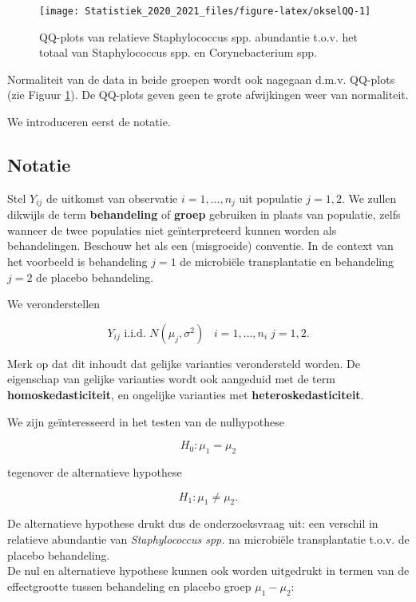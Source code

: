 \documentclass[
  12pt,dutch,coursenotes]{book}
\theoremstyle{definition}
\theoremstyle{definition}
\theoremstyle{definition}
\theoremstyle{remark}
\begin{document}
\begin{figure}

{\centering \texttt{[image: Statistiek\_2020\_2021\_files/figure-latex/okselQQ-1]} 

}

\caption{QQ-plots van relatieve Staphylococcus spp. abundantie t.o.v. het totaal van Staphylococcus spp. en Corynebacterium spp.}\label{fig:okselQQ}
\end{figure}

Normaliteit van de data in beide groepen wordt ook nagegaan d.m.v. QQ-plots (zie Figuur \ref{fig:okselQQ}). De QQ-plots geven geen te grote afwijkingen weer van normaliteit.

We introduceren eerst de notatie.

\hypertarget{notatie}{%
\subsection{Notatie}\label{notatie}}

Stel \(Y_{ij}\) de uitkomst van observatie \(i=1,\ldots, n_j\) uit populatie \(j=1,2\). We zullen dikwijls de term \textbf{behandeling} of \textbf{groep} gebruiken in plaats van populatie, zelfs wanneer de twee populaties niet geïnterpreteerd kunnen worden als behandelingen. Beschouw het als een (misgroeide) conventie. In de context van het voorbeeld is behandeling \(j=1\) de microbiële transplantatie en behandeling \(j=2\) de placebo behandeling.

We veronderstellen

\[Y_{ij}\text{ i.i.d. } N(\mu_j,\sigma^2)\;\;\;i=1,\ldots,n_i\;j=1,2.\]

Merk op dat dit inhoudt dat gelijke varianties verondersteld worden. De eigenschap van gelijke varianties wordt ook aangeduid met de term \textbf{homoskedasticiteit}, en ongelijke varianties met \textbf{heteroskedasticiteit}.

We zijn geïnteresseerd in het testen van de nulhypothese

\[ H_0: \mu_1 = \mu_2 \]

tegenover de alternatieve hypothese

\[  H_1: \mu_1 \neq \mu_2 .\]

De alternatieve hypothese drukt dus de onderzoeksvraag uit: een verschil in relatieve abundantie van \emph{Staphylococcus spp.} na microbiële transplantatie t.o.v. de placebo behandeling.\\
De nul en alternatieve hypothese kunnen ook worden uitgedrukt in termen van de effectgrootte tussen behandeling en placebo groep \(\mu_1-\mu_2\):
\end{document}
